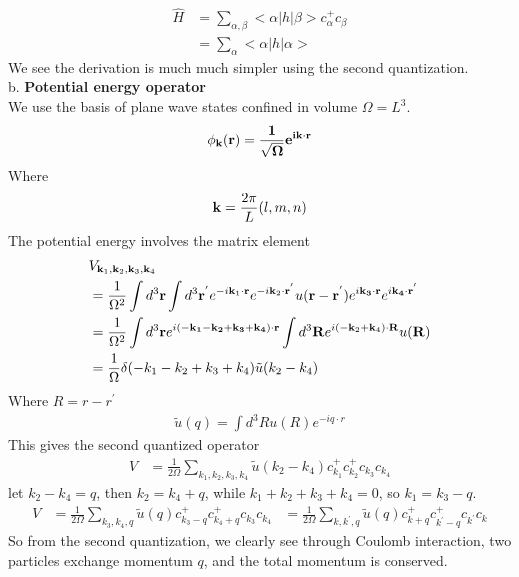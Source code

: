 \documentclass[a4paper]{article}
\begin{document}
\begin{align*}
	\hat H & = \sum_{\alpha,\beta} <\alpha | h | \beta> c^{+}_{\alpha} c_{\beta} \\
		   & = 	\sum_{\alpha} <\alpha | h | \alpha> 
\end{align*}
We see the derivation is much much simpler using the second quantization.\\
b. {\bf Potential energy operator}\\
We use the basis of plane wave states confined in volume $\Omega = L^3$.
\begin{align*}
	\phi_{\bf k}(\bf r) = \frac{1}{\sqrt{\Omega}} e^{i {\bf k} \cdot {\bf r}}
\end{align*}
Where
\begin{align*}
	{\bf k } = \frac{2 \pi}{L} (l, m, n)
\end{align*}
The potential energy involves the matrix element
\begin{align*}
	& V_{{\bf k}_1,{\bf k}_2, {\bf k}_3, {\bf k}_4} \\
	& = \frac{1}{{\Omega^2}} \int d^3 {\bf r} \int d^3 {\bf r^{'}}
	e^{-i {\bf k}_1 \cdot {\bf r}}  e^{-i {\bf k}_2 \cdot {\bf r^{'}}}
	u({\bf r} -{\bf r^{'}} )
	e^{i {\bf k_3 \cdot r}} e^{i{\bf k_4 \cdot r^{'}}} \\
	& = \frac{1}{\Omega^2} \int d^3 {\bf r} 
	e^{i ( - \bf{k}_1 - {\bf k}_2 + {\bf k}_3 + {\bf k}_4) \cdot {\bf r}}	
	\int d^3 {\bf R} e^{i ( -{\bf k}_2 + {\bf k}_4) \cdot {\bf R}}
	u({\bf R})\\
 	& = \frac{1}{\Omega} \delta(-k_1 - k_2 + k_3 + k_4) \tilde u(k_2 - k_4)	
\end{align*}
Where $ R = r - r^{'}$\\
\begin{align*}
	\tilde u (q) = \int d^3 R u(R) e^{-i q \cdot r}
\end{align*}
This gives the second quantized operator
\begin{align*}
	V & = \frac{1}{2 \Omega} \sum_{k_1, k_2, k_3, k_4} \tilde u(k_2 - k_4) c^{+}_{k_1} c^{+}_{k_2} 
	c_{k_3} c_{k_4}
\end{align*}
let $k_2 - k_4 = q$, then $k_2 = k_4 + q$, while $k_1 + k_2 + k_3 + k_4 = 0$, so $k_1 = k_3 -q$.
\begin{align*}
	V & = \frac{1}{2 \Omega} \sum_{k_3, k_4, q} \tilde u(q) c^{+}_{k_3-q} c^{+}_{k_4 + q} 
	c_{k_3} c_{k_4}
	& =\frac{1}{2 \Omega} \sum_{k, k^{'}, q} \tilde u(q) c^{+}_{k+q} c^{+}_{k^{'} - q} 
	c_{k^{'}} c_{k}
\end{align*}
So from the second quantization, we clearly see through Coulomb interaction, two particles exchange momentum $q$, and the total momentum is conserved.\\
\end{document}
